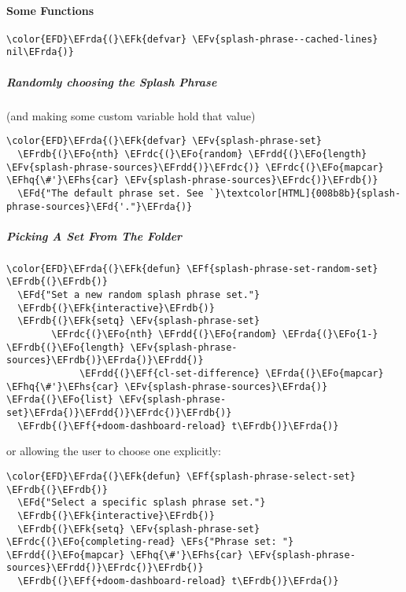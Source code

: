 \documentclass{article}
\newcommand{\EFs}[1]{\textcolor{EFs}{#1}} %
\newcommand{\EFd}[1]{\textcolor{EFd}{#1}} %
\newcommand{\EFk}[1]{\textcolor{EFk}{#1}} %
\newcommand{\EFf}[1]{\textcolor{EFf}{#1}} %
\newcommand{\EFv}[1]{\textcolor{EFv}{#1}} %
\newcommand{\EFo}[1]{\textcolor{EFo}{#1}} %
\newcommand{\EFhq}[1]{#1} %
\newcommand{\EFhs}[1]{\textcolor{EFhs}{#1}} %
\newcommand{\EFrda}[1]{\textcolor{EFrda}{#1}} %
\newcommand{\EFrdb}[1]{\textcolor{EFrdb}{#1}} %
\newcommand{\EFrdc}[1]{\textcolor{EFrdc}{#1}} %
\newcommand{\EFrdd}[1]{\textcolor{EFrdd}{#1}} %
\begin{document}
\paragraph{Some Functions}
\label{sec:org39b5bbe}
\begin{Code}
\begin{Verbatim}
\color{EFD}\EFrda{(}\EFk{defvar} \EFv{splash-phrase--cached-lines} nil\EFrda{)}
\end{Verbatim}
\end{Code}
\subparagraph{Randomly choosing the Splash Phrase}
\label{sec:org97edf3e}
(and making some custom variable hold that value)
\begin{Code}
\begin{Verbatim}
\color{EFD}\EFrda{(}\EFk{defvar} \EFv{splash-phrase-set}
  \EFrdb{(}\EFo{nth} \EFrdc{(}\EFo{random} \EFrdd{(}\EFo{length} \EFv{splash-phrase-sources}\EFrdd{)}\EFrdc{)} \EFrdc{(}\EFo{mapcar} \EFhq{\#'}\EFhs{car} \EFv{splash-phrase-sources}\EFrdc{)}\EFrdb{)}
  \EFd{"The default phrase set. See `}\textcolor[HTML]{008b8b}{splash-phrase-sources}\EFd{'."}\EFrda{)}
\end{Verbatim}
\end{Code}
\subparagraph{Picking A Set From The Folder}
\label{sec:org7cafd76}
\begin{Code}
\begin{Verbatim}
\color{EFD}\EFrda{(}\EFk{defun} \EFf{splash-phrase-set-random-set} \EFrdb{(}\EFrdb{)}
  \EFd{"Set a new random splash phrase set."}
  \EFrdb{(}\EFk{interactive}\EFrdb{)}
  \EFrdb{(}\EFk{setq} \EFv{splash-phrase-set}
        \EFrdc{(}\EFo{nth} \EFrdd{(}\EFo{random} \EFrda{(}\EFo{1-} \EFrdb{(}\EFo{length} \EFv{splash-phrase-sources}\EFrdb{)}\EFrda{)}\EFrdd{)}
             \EFrdd{(}\EFf{cl-set-difference} \EFrda{(}\EFo{mapcar} \EFhq{\#'}\EFhs{car} \EFv{splash-phrase-sources}\EFrda{)} \EFrda{(}\EFo{list} \EFv{splash-phrase-set}\EFrda{)}\EFrdd{)}\EFrdc{)}\EFrdb{)}
  \EFrdb{(}\EFf{+doom-dashboard-reload} t\EFrdb{)}\EFrda{)}
\end{Verbatim}
\end{Code}
or allowing the user to choose one explicitly:
\begin{Code}
\begin{Verbatim}
\color{EFD}\EFrda{(}\EFk{defun} \EFf{splash-phrase-select-set} \EFrdb{(}\EFrdb{)}
  \EFd{"Select a specific splash phrase set."}
  \EFrdb{(}\EFk{interactive}\EFrdb{)}
  \EFrdb{(}\EFk{setq} \EFv{splash-phrase-set} \EFrdc{(}\EFo{completing-read} \EFs{"Phrase set: "} \EFrdd{(}\EFo{mapcar} \EFhq{\#'}\EFhs{car} \EFv{splash-phrase-sources}\EFrdd{)}\EFrdc{)}\EFrdb{)}
  \EFrdb{(}\EFf{+doom-dashboard-reload} t\EFrdb{)}\EFrda{)}
\end{Verbatim}
\end{Code}
\end{document}
